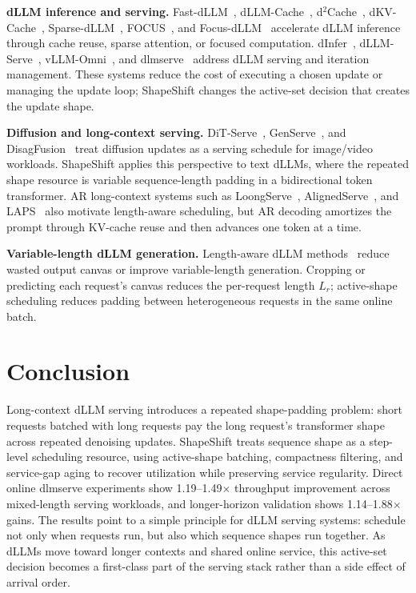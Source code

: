 \documentclass[letterpaper]{article} \usepackage[submission]{aaai2027} \usepackage[hyphens]{url} \usepackage{graphicx} \usepackage{subcaption} \urlstyle{rm} \def\UrlFont{\rm} \usepackage{natbib} \usepackage{amsmath} \usepackage{amssymb} \usepackage{booktabs} \usepackage{multirow} \usepackage{algorithm} \usepackage{algorithmic}
\begin{document}
\textbf{dLLM inference and serving.} Fast-dLLM~\cite{zhao2025fastdllm}, dLLM-Cache~\cite{dllmcache2025}, d$^2$Cache~\cite{d2cache2025}, dKV-Cache~\cite{dkvcache2025}, Sparse-dLLM~\cite{sparsedllm2025}, FOCUS~\cite{focuscompute2026}, and Focus-dLLM~\cite{focusdllm2026} accelerate dLLM inference through cache reuse, sparse attention, or focused computation. dInfer~\cite{dInfer2025}, dLLM-Serve~\cite{dllmserve2025}, vLLM-Omni~\cite{vllmomni2026}, and dlmserve~\cite{dlmserve2026} address dLLM serving and iteration management. These systems reduce the cost of executing a chosen update or managing the update loop; ShapeShift changes the active-set decision that creates the update shape.

\textbf{Diffusion and long-context serving.} DiT-Serve~\cite{ditserve2025}, GenServe~\cite{genserve2026}, and DisagFusion~\cite{disagfusion2026} treat diffusion updates as a serving schedule for image/video workloads. ShapeShift applies this perspective to text dLLMs, where the repeated shape resource is variable sequence-length padding in a bidirectional token transformer. AR long-context systems such as LoongServe~\cite{loongserve2024}, AlignedServe~\cite{alignedserve2026}, and LAPS~\cite{laps2026} also motivate length-aware scheduling, but AR decoding amortizes the prompt through KV-cache reuse and then advances one token at a time.

\textbf{Variable-length dLLM generation.} Length-aware dLLM methods~\cite{nativelength2026} reduce wasted output canvas or improve variable-length generation. Cropping or predicting each request's canvas reduces the per-request length $L_r$; active-shape scheduling reduces padding between heterogeneous requests in the same online batch.

\section{Conclusion}

Long-context dLLM serving introduces a repeated shape-padding problem: short requests batched with long requests pay the long request's transformer shape across repeated denoising updates. ShapeShift treats sequence shape as a step-level scheduling resource, using active-shape batching, compactness filtering, and service-gap aging to recover utilization while preserving service regularity. Direct online dlmserve experiments show 1.19--1.49$\times$ throughput improvement across mixed-length serving workloads, and longer-horizon validation shows 1.14--1.88$\times$ gains. The results point to a simple principle for dLLM serving systems: schedule not only when requests run, but also which sequence shapes run together. As dLLMs move toward longer contexts and shared online service, this active-set decision becomes a first-class part of the serving stack rather than a side effect of arrival order.


\end{document}
